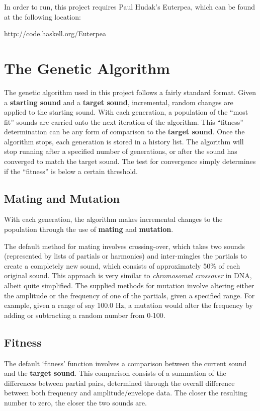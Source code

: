 \documentclass[11pt]{article}
\begin{document}
In order to run, this project requires Paul Hudak's Euterpea, which can be found at the following location:
\begin{code}
http://code.haskell.org/Euterpea
\end{code}

\section{The Genetic Algorithm}

The genetic algorithm used in this project follows a fairly standard format. Given a {\bf starting sound} and a {\bf target sound}, incremental, random changes are applied to the starting sound. With each generation, a population of the ``most fit'' sounds are carried onto the next iteration of the algorithm. This ``fitness'' determination can be any form of comparison to the {\bf target sound}. Once the algorithm stops, each generation is stored in a history list. The algorithm will stop running after a specified number of generations, or after the sound has converged to match the target sound. The test for convergence simply determines if the ``fitness'' is below a certain threshold.

\subsection{Mating and Mutation}

With each generation, the algorithm makes incremental changes to the population through the use of {\bf mating} and {\bf mutation}. 

The default method for mating involves crossing-over, which takes two sounds (represented by lists of partials or harmonics) and inter-mingles the partials to create a completely new sound, which consists of approximately 50\% of each original sound. This approach is very similar to \emph{chromosomal crossover} in DNA, albeit quite simplified.
The supplied methods for mutation involve altering either the amplitude or the frequency of one of the partials, given a specified range. For example, given a range of say 100.0 Hz, a mutation would alter the frequency by adding or subtracting a random number from 0-100.
\subsection{Fitness}

The default `fitness' function involves a comparison between the current sound and the {\bf target sound}. This comparison consists of a summation of the differences between partial pairs, determined through the overall difference between both frequency and amplitude/envelope data. The closer the resulting number to zero, the closer the two sounds are.
\end{document}
